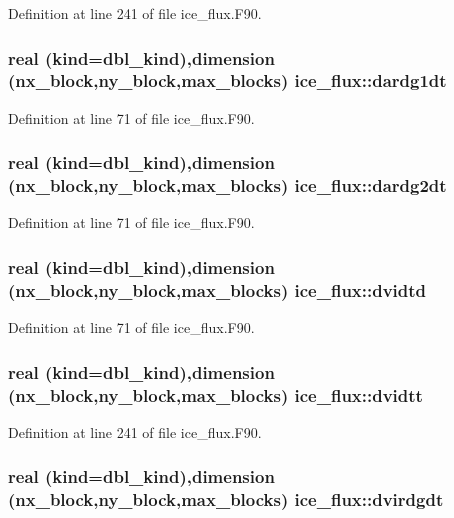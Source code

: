 Definition at line 241 of file ice\_\-flux.F90.\hypertarget{namespaceice__flux_ac0303bfce72171bb93ea1a621dc453eb}{
\subsubsection[{dardg1dt}]{\setlength{\rightskip}{0pt plus 5cm}real (kind=dbl\_\-kind),dimension (nx\_\-block,ny\_\-block,max\_\-blocks) {\bf ice\_\-flux::dardg1dt}}}
\label{namespaceice__flux_ac0303bfce72171bb93ea1a621dc453eb}


Definition at line 71 of file ice\_\-flux.F90.\hypertarget{namespaceice__flux_a8d3dec0f51ebd0b3aaf71909b190656a}{
\subsubsection[{dardg2dt}]{\setlength{\rightskip}{0pt plus 5cm}real (kind=dbl\_\-kind),dimension (nx\_\-block,ny\_\-block,max\_\-blocks) {\bf ice\_\-flux::dardg2dt}}}
\label{namespaceice__flux_a8d3dec0f51ebd0b3aaf71909b190656a}


Definition at line 71 of file ice\_\-flux.F90.\hypertarget{namespaceice__flux_ab2731d6607c7b88522d1a843d4a38a50}{
\subsubsection[{dvidtd}]{\setlength{\rightskip}{0pt plus 5cm}real (kind=dbl\_\-kind),dimension (nx\_\-block,ny\_\-block,max\_\-blocks) {\bf ice\_\-flux::dvidtd}}}
\label{namespaceice__flux_ab2731d6607c7b88522d1a843d4a38a50}


Definition at line 71 of file ice\_\-flux.F90.\hypertarget{namespaceice__flux_a7c8b98f21bf9431f5d2a10d6643f0752}{
\subsubsection[{dvidtt}]{\setlength{\rightskip}{0pt plus 5cm}real (kind=dbl\_\-kind),dimension (nx\_\-block,ny\_\-block,max\_\-blocks) {\bf ice\_\-flux::dvidtt}}}
\label{namespaceice__flux_a7c8b98f21bf9431f5d2a10d6643f0752}


Definition at line 241 of file ice\_\-flux.F90.\hypertarget{namespaceice__flux_ade5480c0fdf0d8989ec199ab6c494df2}{
\subsubsection[{dvirdgdt}]{\setlength{\rightskip}{0pt plus 5cm}real (kind=dbl\_\-kind),dimension (nx\_\-block,ny\_\-block,max\_\-blocks) {\bf ice\_\-flux::dvirdgdt}}}
\label{namespaceice__flux_ade5480c0fdf0d8989ec199ab6c494df2}


